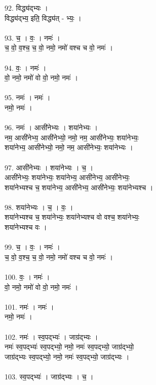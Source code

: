 92. विद्ध्य॑द्भ्यः ।\\
विद्ध्य॑द्भ्य॒ इति॒ विद्ध्य॑त् - भ्यः॒ ।\\
\\
93. च॒ । वः॒ । नमः॑ ।\\
च॒ वो॒ व॒श्च॒ च॒ वो॒ नमो॒ नमो॑ वश्च च वो॒ नमः॑ ।\\
\\
94. वः॒ । नमः॑ ।\\
वो॒ नमो॒ नमो॑ वो वो॒ नमो॒ नमः॑ ।\\
\\
95. नमः॑ । नमः॑ ।\\
नमो॒ नमः॑ ।\\
\\
96. नमः॑ । आसी॑नेभ्यः । शया॑नेभ्यः ।\\
नम॒ आसी॑नेभ्य॒ आसी॑नेभ्यो॒ नमो॒ नम॒ आसी॑नेभ्यः॒ शया॑नेभ्यः॒\\
शया॑नेभ्य॒ आसी॑नेभ्यो॒ नमो॒ नम॒ आसी॑नेभ्यः॒ शया॑नेभ्यः ।\\
\\
97. आसी॑नेभ्यः । शया॑नेभ्यः । च॒ ।\\
आसी॑नेभ्यः॒ शया॑नेभ्यः॒ शया॑नेभ्य॒ आसी॑नेभ्य॒ आसी॑नेभ्यः॒\\
शया॑नेभ्यश्च च॒ शया॑नेभ्य॒ आसी॑नेभ्य॒ आसी॑नेभ्यः॒ शया॑नेभ्यश्च ।\\
\\
98. शया॑नेभ्यः । च॒ । वः॒ ।\\
शया॑नेभ्यश्च च॒ शया॑नेभ्यः॒ शया॑नेभ्यश्च वो वश्च॒ शया॑नेभ्यः॒\\
शया॑नेभ्यश्च वः ।\\
\\
99. च॒ । वः॒ । नमः॑ ।\\
च॒ वो॒ व॒श्च॒ च॒ वो॒ नमो॒ नमो॑ वश्च च वो॒ नमः॑ ।\\
\\
100. वः॒ । नमः॑ ।\\
वो॒ नमो॒ नमो॑ वो वो॒ नमो॒ नमः॑ ।\\
\\
101. नमः॑ । नमः॑ ।\\
नमो॒ नमः॑ ।\\
\\
102. नमः॑ । स्व॒पद्भ्यः॑ । जाग्र॑द्भ्यः ।\\
नमः॑ स्व॒पद्भ्यः॑ स्व॒पद्भ्यो॒ नमो॒ नमः॑ स्व॒पद्भ्यो॒ जाग्र॑द्भ्यो॒\\
जाग्र॑द्भ्यः स्व॒पद्भ्यो॒ नमो॒ नमः॑ स्व॒पद्भ्यो॒ जाग्र॑द्भ्यः ।\\
\\
103. स्व॒पद्भ्यः॑ । जाग्र॑द्भ्यः । च॒ ।\\
